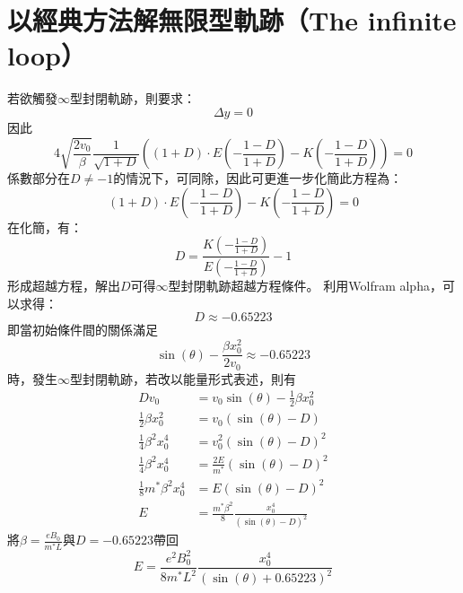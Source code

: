 \documentclass[12pt]{article}
\begin{document}
\section{以經典方法解無限型軌跡（The infinite loop）}
若欲觸發$\infty$型封閉軌跡，則要求：
\begin{equation}
    \Delta y=0
\end{equation}
因此
\begin{equation}
    4\sqrt{\frac{2v_0}{\beta}}\frac{1}{\sqrt{1+D}}\left((1+D)\cdot E\left(-\frac{1-D}{1+D}\right)-K\left(-\frac{1-D}{1+D}\right)\right)=0
\end{equation}
係數部分在$D\neq-1$的情況下，可同除，因此可更進一步化簡此方程為：
\begin{equation}
    (1+D)\cdot E\left(-\frac{1-D}{1+D}\right)-K\left(-\frac{1-D}{1+D}\right)=0
\end{equation}
在化簡，有：
\begin{equation}
    D=\frac{K\left(-\frac{1-D}{1+D}\right)}{E\left(-\frac{1-D}{1+D}\right)}-1
\end{equation}
形成超越方程，解出$D$可得$\infty$型封閉軌跡超越方程條件。
\newline\noindent
利用Wolfram alpha，可以求得：
\begin{equation}
    D\approx-0.65223
\end{equation}
即當初始條件間的關係滿足
\begin{equation}
    \sin{(\theta)}-\frac{\beta x_0^2}{2v_0}\approx-0.65223
\end{equation}
時，發生$\infty$型封閉軌跡，若改以能量形式表述，則有
\begin{align*}
    Dv_0&=v_0\sin{(\theta)}-\frac12\beta x_0^2\\
    \frac12\beta x_0^2&=v_0(\sin{(\theta)}-D)\\
    \frac14\beta^2x_0^4&=v_0^2(\sin{(\theta)}-D)^2\\
    \frac14\beta^2x_0^4&=\frac{2E}{m^*}(\sin{(\theta)}-D)^2\\
    \frac18m^*\beta^2x_0^4&=E(\sin{(\theta)}-D)^2\\
    E&=\frac{m^*\beta^2}{8}\frac{x_0^4}{(\sin{(\theta)}-D)^2}
\end{align*}
將$\beta=\frac{eB_0}{m^*L}$與$D=-0.65223$帶回
\begin{equation}
    E=\frac{e^2B_0^2}{8m^*L^2}\frac{x_0^4}{(\sin{(\theta)}+0.65223)^2}
\end{equation}
\end{document}
